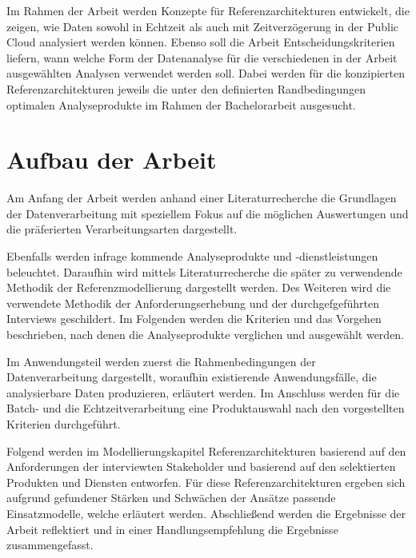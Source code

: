 Im Rahmen der Arbeit werden Konzepte für Referenzarchitekturen entwickelt, die zeigen, wie Daten sowohl in Echtzeit als auch mit Zeitverzögerung in der Public Cloud analysiert werden können. 
Ebenso soll die Arbeit Entscheidungskriterien liefern, wann welche Form der Datenanalyse für die verschiedenen in der Arbeit ausgewählten Analysen verwendet werden soll. 
Dabei werden für die konzipierten Referenzarchitekturen jeweils die unter den definierten Randbedingungen optimalen Analyseprodukte im Rahmen der Bachelorarbeit ausgesucht.

\section{Aufbau der Arbeit}

Am Anfang der Arbeit werden anhand einer Literaturrecherche die Grundlagen der Datenverarbeitung mit speziellem Fokus auf die möglichen Auswertungen und die präferierten Verarbeitungsarten dargestellt. 

Ebenfalls werden infrage kommende Analyseprodukte und -dienstleistungen beleuchtet. 
Daraufhin wird mittels Literaturrecherche die später zu verwendende Methodik der Referenzmodellierung dargestellt werden. 
Des Weiteren wird die verwendete Methodik der Anforderungserhebung und der durchgefgeführten Interviews geschildert. 
Im Folgenden werden die Kriterien und das Vorgehen beschrieben, nach denen die Analyseprodukte verglichen und ausgewählt werden. 

Im Anwendungsteil werden zuerst die Rahmenbedingungen der Datenverarbeitung dargestellt, woraufhin existierende Anwendungsfälle, die analysierbare Daten produzieren, erläutert werden. 
Im Anschluss werden für die Batch- und die Echtzeitverarbeitung eine Produktauswahl nach den vorgestellten Kriterien durchgeführt. 

Folgend werden im Modellierungskapitel Referenzarchitekturen basierend auf den Anforderungen der interviewten Stakeholder und basierend auf den selektierten Produkten und Diensten entworfen. Für diese Referenzarchitekturen ergeben sich aufgrund gefundener Stärken und
Schwächen der Ansätze passende Einsatzmodelle, welche erläutert werden. Abschließend werden die Ergebnisse der Arbeit reflektiert und in einer Handlungsempfehlung die Ergebnisse zusammengefasst.